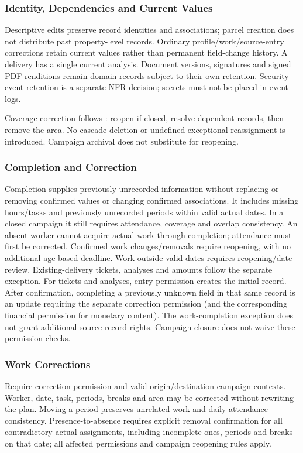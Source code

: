 \subsubsection{Identity, Dependencies and Current Values}
\label{sec:identity-current-values}
Descriptive edits preserve record identities and associations; parcel creation
does not distribute past property-level records. Ordinary profile/work/source-entry
corrections retain current values rather than permanent field-change history.
A delivery has a single current analysis. Document versions, signatures and signed PDF renditions remain domain records subject to their own retention. Security-event retention is a separate NFR decision;
secrets must not be placed in event logs.

Coverage correction follows : reopen if closed, resolve dependent records,
then remove the area. No cascade deletion or undefined exceptional reassignment
is introduced. Campaign archival does not substitute for reopening.

\subsubsection{Completion and Correction}
\label{sec:completion-correction}
Completion supplies previously unrecorded information without replacing or
removing confirmed values or changing confirmed associations. It includes
missing hours/tasks and previously unrecorded periods within valid actual dates.
In a closed campaign it still requires attendance, coverage and overlap consistency.
An absent worker cannot acquire actual work through completion; attendance must
first be corrected. Confirmed work changes/removals require reopening, with no
additional age-based deadline. Work outside valid dates requires reopening/date review.
Existing-delivery tickets, analyses and amounts follow the separate  exception.
For tickets and analyses, entry permission creates the initial record. After
confirmation, completing a previously unknown field in that same record is an
update requiring the separate correction permission (and the corresponding
financial permission for monetary content). The work-completion exception does
not grant additional source-record rights. Campaign closure does not waive these
permission checks.

\subsubsection{Work Corrections}
\label{sec:work-corrections}
Require correction permission and valid origin/destination campaign contexts.
Worker, date, task, periods, breaks and area may be corrected without rewriting
the plan. Moving a period preserves unrelated work and daily-attendance consistency.
Presence-to-absence requires explicit removal confirmation for all contradictory
actual assignments, including incomplete ones, periods and breaks on that date;
all affected permissions and campaign reopening rules apply.

